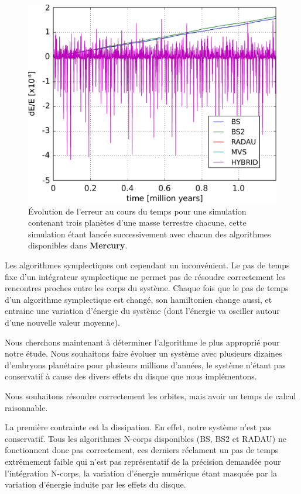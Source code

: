 \begin{figure}[htb]
\centering
\includegraphics[width=0.65\linewidth]{figure/energy_error.pdf}
\caption{Évolution de l'erreur au cours du temps pour une simulation contenant trois planètes d'une masse terrestre chacune, cette simulation étant lancée successivement avec chacun des algorithmes disponibles dans \textbf{Mercury}.}\label{fig:energy_error}
\end{figure}

Les algorithmes symplectiques ont cependant un inconvénient. Le pas de temps fixe d'un intégrateur symplectique ne permet pas de résoudre correctement les rencontres proches entre les corps du système. Chaque fois que le pas de temps d'un algorithme symplectique est changé, son hamiltonien change aussi, et entraine une variation d'énergie du système (dont l'énergie va osciller autour d'une nouvelle valeur moyenne). 

\bigskip

Nous cherchons maintenant à déterminer l'algorithme le plus approprié pour notre étude. Nous souhaitons faire évoluer un système avec plusieurs dizaines d'embryons planétaire pour plusieurs millions d'années, le système n'étant pas conservatif à cause des divers effets du disque que nous implémentons. 

Nous souhaitons résoudre correctement les orbites, mais avoir un temps de calcul raisonnable. 

La première contrainte est la dissipation. En effet, notre système n'est pas conservatif. Tous les algorithmes N-corps disponibles (BS, BS2 et RADAU) ne fonctionnent donc pas correctement, ces derniers réclament un pas de temps extrêmement faible qui n'est pas représentatif de la précision demandée pour l'intégration N-corps, la variation d'énergie numérique étant masquée par la variation d'énergie induite par les effets du disque. 

